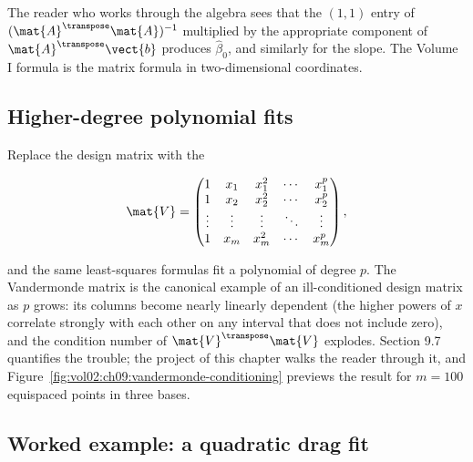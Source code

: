 The reader who works through the algebra sees that the $(1,1)$
entry of $(\mat{A}^{\transpose}\mat{A})^{-1}$ multiplied by the
appropriate component of $\mat{A}^{\transpose}\vect{b}$ produces
$\hat{\beta}_{0}$, and similarly for the slope. The Volume I
formula is the matrix formula in two-dimensional coordinates.

\subsection{Higher-degree polynomial fits}

Replace the design matrix with the 

\[
\mat{V} = \begin{pmatrix} 1 & x_{1} & x_{1}^{2} & \cdots & x_{1}^{p}
\\ 1 & x_{2} & x_{2}^{2} & \cdots & x_{2}^{p} \\ \vdots & \vdots &
\vdots & \ddots & \vdots \\ 1 & x_{m} & x_{m}^{2} & \cdots &
x_{m}^{p} \end{pmatrix},
\]

and the same least-squares formulas fit a polynomial of degree $p$.
The Vandermonde matrix is the canonical example of an
ill-conditioned design matrix as $p$ grows: its columns become
nearly linearly dependent (the higher powers of $x$ correlate
strongly with each other on any interval that does not include
zero), and the condition number of $\mat{V}^{\transpose}\mat{V}$
explodes. Section 9.7 quantifies the trouble; the project of this
chapter walks the reader through it, and
Figure~\ref{fig:vol02:ch09:vandermonde-conditioning} previews the
result for $m = 100$ equispaced points in three bases.



\subsection{Worked example: a quadratic drag fit}

